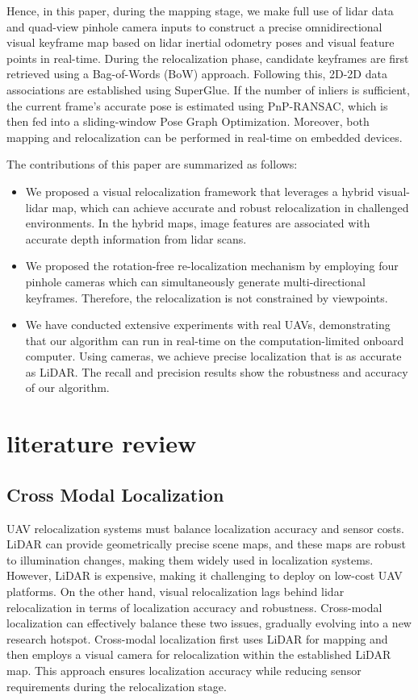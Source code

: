 \documentclass[conference]{./support/ieeeconf}
\begin{document}
Hence, in this paper, during the mapping stage, we make full use of lidar data and quad-view pinhole camera inputs to construct a precise omnidirectional visual keyframe map based on lidar inertial odometry poses and visual feature points in real-time. During the relocalization phase, candidate keyframes are first retrieved using a Bag-of-Words (BoW) approach\cite{GalvezTRO12DBOW}. Following this, 2D-2D data associations are established using SuperGlue\cite{sarlin2020superglue}. If the number of inliers is sufficient, the current frame’s accurate pose is estimated using PnP-RANSAC, which is then fed into a sliding-window Pose Graph Optimization. Moreover, both mapping and relocalization can be performed in real-time on embedded devices.

The contributions of this paper are summarized as follows:
\begin{itemize}
	\item  We proposed a visual relocalization framework that leverages a hybrid visual-lidar map, which can achieve accurate and robust relocalization in challenged environments. In the hybrid maps, image features are associated with accurate depth information from lidar scans. 

	\item We proposed the rotation-free re-localization mechanism by employing four pinhole cameras which can simultaneously generate multi-directional keyframes. Therefore, the relocalization is not constrained by viewpoints.

	\item We have conducted extensive experiments with real UAVs, demonstrating that our algorithm can run in real-time on the computation-limited onboard computer. Using cameras, we achieve precise localization that is as accurate as LiDAR. The recall and precision results show the robustness and accuracy of our algorithm.

\end{itemize}   

\section{literature review}

\subsection{Cross Modal Localization}
UAV relocalization systems must balance localization accuracy and sensor costs.
LiDAR can provide geometrically precise scene maps, and these maps are robust to illumination changes, making them widely used in localization systems.
However, LiDAR is expensive, making it challenging to deploy on low-cost UAV platforms.
On the other hand, visual relocalization lags behind lidar relocalization in terms of localization accuracy and robustness.
Cross-modal localization can effectively balance these two issues, gradually evolving into a new research hotspot.
Cross-modal localization first uses LiDAR for mapping and then employs a visual camera for relocalization within the established LiDAR map\cite{caselitz2016monocular,zhang2023cross}.
This approach ensures localization accuracy while reducing sensor requirements during the relocalization stage.
\end{document}
